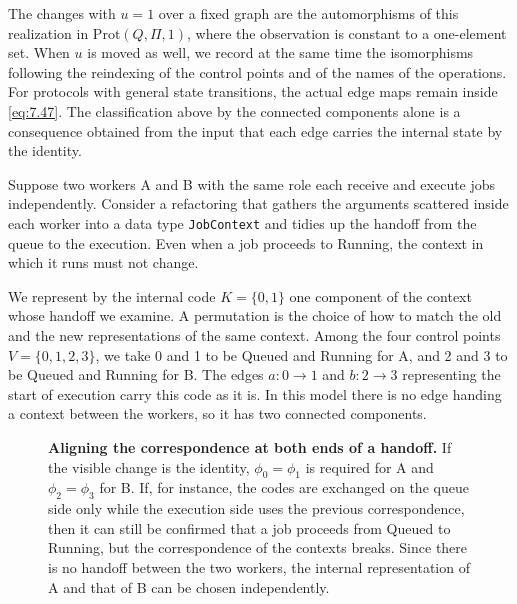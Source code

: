The changes with $u=1$ over a fixed graph are the automorphisms of this realization in
$\mathrm{Prot}(Q,\Pi,1)$, where the observation is constant to a one-element set.
When $u$ is moved as well, we record at the same time the isomorphisms following the
reindexing of the control points and of the names of the operations.
For protocols with general state transitions, the actual edge maps remain inside
\eqref{eq:7.47}.
The classification above by the connected components alone is a consequence obtained from
the input that each edge carries the internal state by the identity.

\begin{example}\label{ex:7.30}

Suppose two workers A and B with the same role each receive and execute jobs independently.
Consider a refactoring that gathers the arguments scattered inside each worker into a data
type \texttt{JobContext} and tidies up the handoff from the queue to the execution.
Even when a job proceeds to Running, the context in which it runs must not change.

We represent by the internal code $K=\{0,1\}$ one component of the context whose handoff we examine.
A permutation is the choice of how to match the old and the new representations of the same
context.
Among the four control points $V=\{0,1,2,3\}$, we take 0 and 1 to be Queued and Running for
A, and 2 and 3 to be Queued and Running for B.
The edges $a:0\to1$ and $b:2\to3$ representing the start of execution carry this code as it
is.
In this model there is no edge handing a context between the workers, so it has two
connected components.

\end{example}

\begin{figure}[htbp]
\centering

\caption{\textbf{Aligning the correspondence at both ends of a handoff.} If the visible
change is the identity, $\phi_0=\phi_1$ is required for A and $\phi_2=\phi_3$ for B.
If, for instance, the codes are exchanged on the queue side only while the execution side
uses the previous correspondence, then it can still be confirmed that a job proceeds from
Queued to Running, but the correspondence of the contexts breaks.
Since there is no handoff between the two workers, the internal representation of A and that
of B can be chosen independently.}\label{fig:7.1}
\end{figure}

